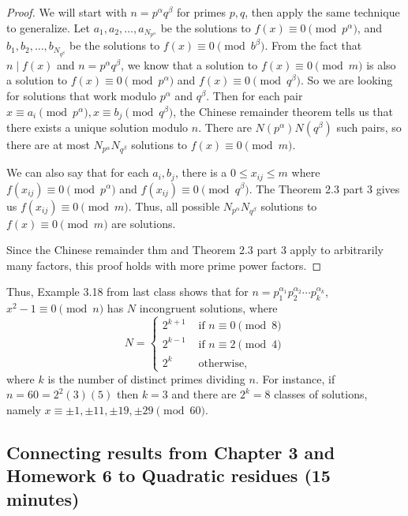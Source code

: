 \documentclass[letterpaper, 11 pt]{article}
\begin{document}
\begin{proof}
We will start with $n=p^\alpha q^\beta$ for primes $p,q$, then apply the same technique to generalize. Let $a_1, a_2,\dots, a_{N_{p^\alpha}}$ be the solutions to $f(x)\equiv 0 \pmod{p^\alpha}$, and $b_1, b_2,\dots, b_{N_{q^\beta}}$ be the solutions to $f(x)\equiv 0\pmod{b^\beta}$. From the fact that $n\mid f(x)$ and $n=p^\alpha q^\beta$, we know that a solution to $f(x)\equiv 0\pmod m$ is also a solution to $f(x)\equiv 0 \pmod{p^\alpha}$ and $f(x)\equiv 0 \pmod{q^\beta}$. So we are looking for solutions that work modulo $p^\alpha$ and $q^\beta$. Then for each pair $x \equiv a_i \pmod{p^\alpha}, x\equiv b_j \pmod{q^\beta}$, the Chinese remainder theorem tells us that there exists a unique solution modulo $n$. There are $N(p^\alpha) N(q^\beta)$ such pairs, so there are at most $N_{p^\alpha} N_{q^\beta}$ solutions to $f(x)\equiv 0 \pmod m$.

We can also say that for each $a_i, b_j$, there is a $0\leq x_{ij}\leq m$ where $f(x_{ij})\equiv 0\pmod{p^\alpha}$ and $f(x_{ij})\equiv0\pmod{q^\beta}$. The Theorem 2.3 part 3 gives us $f(x_{ij})\equiv 0 \pmod m$. Thus, all possible $N_{p^\alpha} N_{q^\beta}$ solutions to $f(x)\equiv 0 \pmod m$ are solutions.

Since the Chinese remainder thm and Theorem 2.3 part 3 apply to arbitrarily many factors, this proof holds with more prime power factors.
\end{proof}

Thus, Example 3.18 from last class shows that for $n=p_1^{\alpha_1}p_2^{\alpha_2}\cdots p_k^{\alpha_k}$, $x^2-1\equiv 0 \pmod n$ has $N$ incongruent solutions, where \[N=
\begin{cases}
 2^{k+1} &\textrm{ if $n\equiv 0 \pmod 8$}\\
  2^{k-1} &\textrm{ if $n\equiv 2 \pmod 4$}\\
  2^{k} &\textrm{ otherwise},
\end{cases}\]
where $k$ is the number of distinct primes dividing $n$. For instance, if $n = 60 = 2^2(3)(5)$ then $k = 3$ and there are $2^k = 8$ classes of solutions, namely $x \equiv \pm1, \pm11, \pm19, \pm29 \pmod{60}.$
\subsection{Connecting results from Chapter 3 and Homework 6 to Quadratic residues (15 minutes)}
\end{document}
